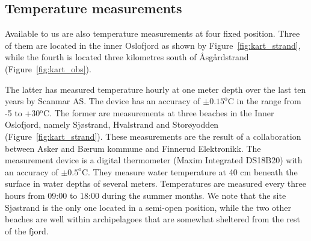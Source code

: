 \subsection{Temperature measurements}
\label{subsec:tempeo}
Available to us are also temperature measurements at four fixed position. Three of them are located in the inner Oslofjord as shown by Figure~\ref{fig:kart_strand}, while the fourth is located three kilometres south of {\AA}sg{\aa}rdstrand (Figure~\ref{fig:kart_obs}).

The latter has measured temperature hourly at one meter depth over the last ten years by Scanmar AS. The device has an accuracy of $\pm 0.15^{\textrm{o}}$C in the range from -5 to +30$^{\textrm{o}}$C. The former are measurements at three beaches in the Inner Oslofjord, namely Sj{\o}strand, Hvalstrand and Stor{\o}yodden (Figure~\ref{fig:kart_strand}). These measurements are the result of a collaboration between Asker and B{\ae}rum kommune and Finnerud Elektronikk. The measurement device is a digital thermometer (Maxim Integrated DS18B20) with an accuracy of $\pm 0.5^{\textrm{o}}$C. They measure water temperature at 40 cm beneath the surface in water depths of several meters. Temperatures are measured every three hours from 09:00 to 18:00 during the summer months. We note that the site Sj{\o}strand is the only one located in a semi-open position, while the two other beaches are well within archipelagoes that are somewhat sheltered from the rest of the fjord.


